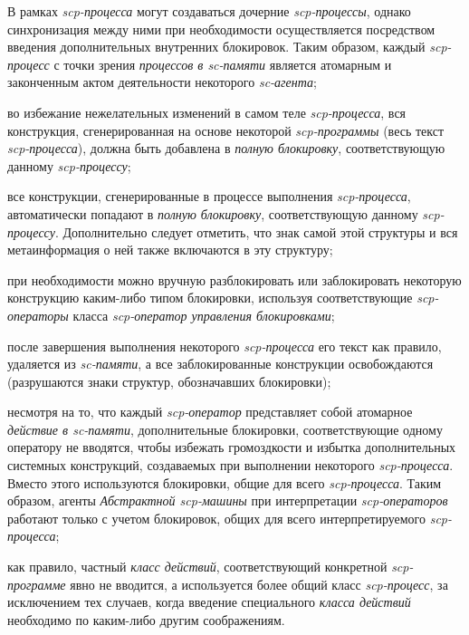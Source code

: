 \begin{textitemize}
    \item В рамках \textit{scp-процесса} могут создаваться дочерние \textit{scp-процессы}, однако синхронизация между ними при необходимости осуществляется посредством введения дополнительных внутренних блокировок. Таким образом, каждый \textit{scp-процесс} с точки зрения \textit{процессов в sc-памяти} является атомарным и законченным актом деятельности некоторого \textit{sc-агента};
\item во избежание нежелательных изменений в самом теле \textit{scp-процесса}, вся конструкция, сгенерированная на основе некоторой \textit{scp-программы} (весь текст \textit{scp-процесса}), должна быть добавлена в \textit{полную блокировку}, соответствующую данному \textit{scp-процессу};
\item все конструкции, сгенерированные в процессе выполнения
\textit{scp-процесса}, автоматически попадают в \textit{полную 	блокировку}, соответствующую данному \textit{scp-процессу}. Дополнительно следует отметить, что знак самой этой структуры и вся метаинформация о ней также включаются в эту структуру;
\item при необходимости можно вручную разблокировать или заблокировать некоторую конструкцию каким-либо типом блокировки, используя соответствующие \textit{scp-операторы} класса \textit{scp-оператор управления блокировками};
\item после завершения выполнения некоторого \textit{scp-процесса} его текст как правило, удаляется из \textit{\mbox{sc-памяти}}, а все заблокированные конструкции освобождаются (разрушаются знаки структур, обозначавших блокировки);
\item несмотря на то, что каждый \textit{scp-оператор} представляет собой атомарное \textit{действие в sc-памяти}, дополнительные блокировки, соответствующие одному оператору не вводятся, чтобы избежать громоздкости и избытка дополнительных системных конструкций, создаваемых при выполнении некоторого \textit{scp-процесса}. Вместо этого используются блокировки, общие для всего \textit{scp-процесса}. Таким образом, агенты \textit{Абстрактной scp-машины} при интерпретации \textit{scp-операторов} работают только с учетом блокировок, общих для всего интерпретируемого \textit{scp-процесса};
\item как правило, частный \textit{класс действий}, соответствующий конкретной \textit{scp-программе} явно не вводится, а используется более общий класс \textit{scp-процесс}, за исключением тех случаев, когда введение специального \textit{класса действий} необходимо по каким-либо другим соображениям.
\end{textitemize}

